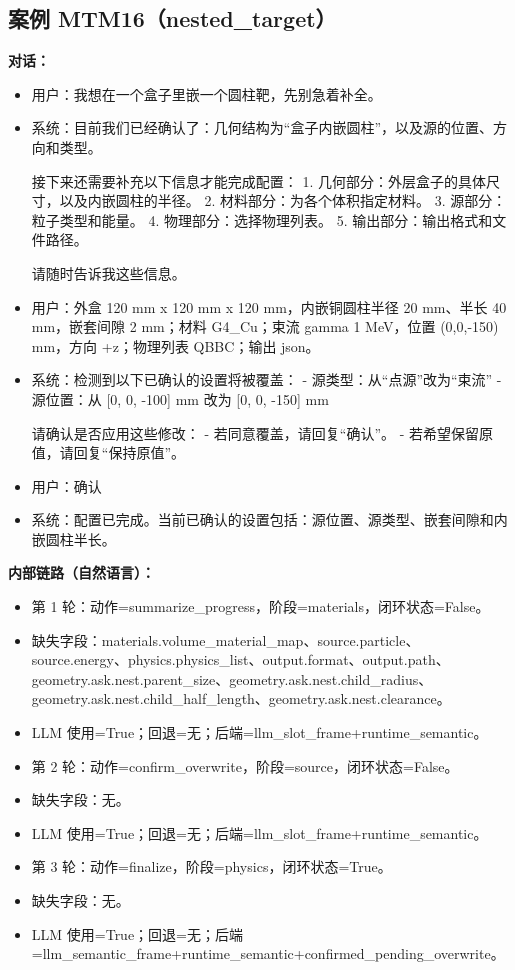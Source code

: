 \documentclass[11pt]{ctexart}
\begin{document}
\subsection{案例 MTM16（nested\_target）}
\textbf{对话：}
\begin{itemize}
\item 用户：我想在一个盒子里嵌一个圆柱靶，先别急着补全。
\item 系统：目前我们已经确认了：几何结构为“盒子内嵌圆柱”，以及源的位置、方向和类型。

接下来还需要补充以下信息才能完成配置：
1. 几何部分：外层盒子的具体尺寸，以及内嵌圆柱的半径。
2. 材料部分：为各个体积指定材料。
3. 源部分：粒子类型和能量。
4. 物理部分：选择物理列表。
5. 输出部分：输出格式和文件路径。

请随时告诉我这些信息。
\item 用户：外盒 120 mm x 120 mm x 120 mm，内嵌铜圆柱半径 20 mm、半长 40 mm，嵌套间隙 2 mm；材料 G4\_Cu；束流 gamma 1 MeV，位置 (0,0,-150) mm，方向 +z；物理列表 QBBC；输出 json。
\item 系统：检测到以下已确认的设置将被覆盖：
- 源类型：从“点源”改为“束流”
- 源位置：从 [0, 0, -100] mm 改为 [0, 0, -150] mm

请确认是否应用这些修改：
- 若同意覆盖，请回复“确认”。
- 若希望保留原值，请回复“保持原值”。
\item 用户：确认
\item 系统：配置已完成。当前已确认的设置包括：源位置、源类型、嵌套间隙和内嵌圆柱半长。
\end{itemize}
\textbf{内部链路（自然语言）：}
\begin{itemize}
\item 第 1 轮：动作=summarize\_progress，阶段=materials，闭环状态=False。
\item 缺失字段：materials.volume\_material\_map、source.particle、source.energy、physics.physics\_list、output.format、output.path、geometry.ask.nest.parent\_size、geometry.ask.nest.child\_radius、geometry.ask.nest.child\_half\_length、geometry.ask.nest.clearance。
\item LLM 使用=True；回退=无；后端=llm\_slot\_frame+runtime\_semantic。
\item 第 2 轮：动作=confirm\_overwrite，阶段=source，闭环状态=False。
\item 缺失字段：无。
\item LLM 使用=True；回退=无；后端=llm\_slot\_frame+runtime\_semantic。
\item 第 3 轮：动作=finalize，阶段=physics，闭环状态=True。
\item 缺失字段：无。
\item LLM 使用=True；回退=无；后端=llm\_semantic\_frame+runtime\_semantic+confirmed\_pending\_overwrite。
\end{itemize}
\end{document}
